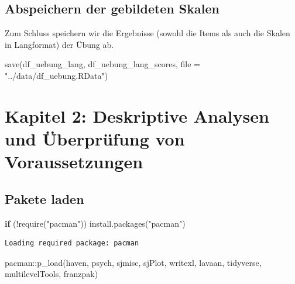 \documentclass[
  letterpaper,
  DIV=11,
  numbers=noendperiod]{scrreprt}
\newenvironment{Shaded}{\begin{snugshade}}{\end{snugshade}}
\newcommand{\AttributeTok}[1]{\textcolor[rgb]{0.40,0.45,0.13}{#1}}
\newcommand{\ControlFlowTok}[1]{\textcolor[rgb]{0.00,0.23,0.31}{\textbf{#1}}}
\newcommand{\FunctionTok}[1]{\textcolor[rgb]{0.28,0.35,0.67}{#1}}
\newcommand{\NormalTok}[1]{\textcolor[rgb]{0.00,0.23,0.31}{#1}}
\newcommand{\SpecialCharTok}[1]{\textcolor[rgb]{0.37,0.37,0.37}{#1}}
\newcommand{\StringTok}[1]{\textcolor[rgb]{0.13,0.47,0.30}{#1}}
\begin{document}
\section{Abspeichern der gebildeten
Skalen}\label{abspeichern-der-gebildeten-skalen}

Zum Schluss speichern wir die Ergebnisse (sowohl die Items als auch die
Skalen in Langformat) der Übung ab.

\begin{Shaded}
\begin{Highlighting}[]
\FunctionTok{save}\NormalTok{(df\_uebung\_lang, df\_uebung\_lang\_scores, }\AttributeTok{file =} \StringTok{"../data/df\_uebung.RData"}\NormalTok{)}
\end{Highlighting}
\end{Shaded}


\chapter{Kapitel 2: Deskriptive Analysen und Überprüfung von
Voraussetzungen}\label{kapitel-2-deskriptive-analysen-und-uxfcberpruxfcfung-von-voraussetzungen}

\section{Pakete laden}\label{pakete-laden}

\begin{Shaded}
\begin{Highlighting}[]
\ControlFlowTok{if}\NormalTok{ (}\SpecialCharTok{!}\FunctionTok{require}\NormalTok{(}\StringTok{"pacman"}\NormalTok{)) }\FunctionTok{install.packages}\NormalTok{(}\StringTok{"pacman"}\NormalTok{)}
\end{Highlighting}
\end{Shaded}

\begin{verbatim}
Loading required package: pacman
\end{verbatim}

\begin{Shaded}
\begin{Highlighting}[]
\NormalTok{pacman}\SpecialCharTok{::}\FunctionTok{p\_load}\NormalTok{(haven, psych,}
\NormalTok{               sjmisc, sjPlot, writexl, lavaan,}
\NormalTok{               tidyverse, multilevelTools, franzpak)}
\end{Highlighting}
\end{Shaded}
\end{document}
